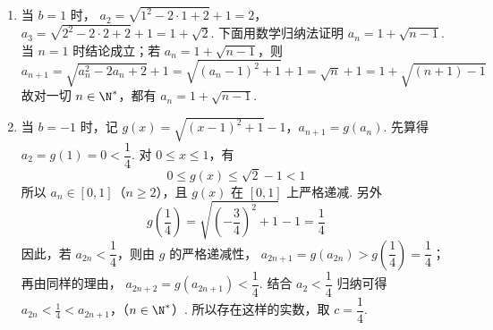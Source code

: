 \begin{solution}
\begin{enumerate}
\item 当 \(b=1\) 时，
\(a_2=\sqrt{1^2-2\cdot1+2}+1=2\)，\(a_3=\sqrt{2^2-2\cdot2+2}+1=1+\sqrt{2}\).
下面用数学归纳法证明 \(a_n=1+\sqrt{n-1}\). 当 \(n=1\) 时结论成立；若 \(a_n=1+\sqrt{n-1}\)，则
\[
a_{n+1}=\sqrt{a_n^2-2a_n+2}+1
 =\sqrt{(a_n-1)^2+1}+1
 =\sqrt{n}+1=1+\sqrt{(n+1)-1}
\]
故对一切 \(n\in\N^*\)，都有 \(a_n=1+\sqrt{n-1}\).

\item 当 \(b=-1\) 时，记
\(g(x)=\sqrt{(x-1)^2+1}-1\)，\(a_{n+1}=g(a_n)\).
先算得 \(a_2=g(1)=0<\dfrac{1}{4}\). 对 \(0\leqslant x\leqslant1\)，有
\[
0\leqslant g(x)\leqslant\sqrt{2}-1<1
\]
所以 \(a_n\in[0,1]\)（\(n\geqslant2\)），且 \(g(x)\) 在 \([0,1]\) 上严格递减. 另外
\[
g\left(\frac{1}{4}\right)=\sqrt{\left(-\frac{3}{4}\right)^2+1}-1=\frac{1}{4}
\]
因此，若 \(a_{2n}<\dfrac{1}{4}\)，则由 \(g\) 的严格递减性，
\(a_{2n+1}=g(a_{2n})>g\left(\dfrac{1}{4}\right)=\dfrac{1}{4}\)；再由同样的理由，
\(a_{2n+2}=g(a_{2n+1})<\dfrac{1}{4}\). 结合 \(a_2<\dfrac{1}{4}\) 归纳可得
\(a_{2n}<\frac{1}{4}<a_{2n+1}\)，（\(n\in\N^*\)）.
所以存在这样的实数，取 \(c=\dfrac{1}{4}\).
\end{enumerate}
\end{solution}
